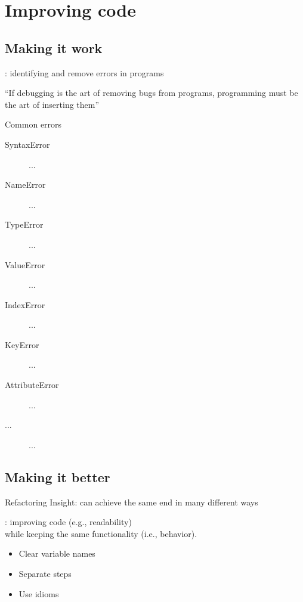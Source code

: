 \documentclass[aspectratio=169,usenames,dvipsnames]{beamer}
\begin{document}
\begin{frame}
\begin{columns}[b]
    \end{columns}
\end{frame}


\section{Improving code}
\subsection{Making it work}
\frame{\tableofcontents[currentsection]}
\begin{frame}
    \begin{definition}
        : identifying and remove errors in programs
    \end{definition}

    \pause

    ``If debugging is the art of removing bugs from programs,
    programming must be the art of inserting them''

\end{frame}

\begin{frame}{Common errors}
    \begin{description}
        \item[SyntaxError] ...
        \item[NameError] ...
        \item[TypeError] ...
        \item[ValueError] ...
        \item[IndexError] ...
        \item[KeyError] ...
        \item[AttributeError] ...
        \item[...] ...
    \end{description}
\end{frame}

\subsection{Making it better}
\frame{\tableofcontents[currentsection]}

\begin{frame}{Refactoring}
	Insight: can achieve the same end in many different ways

	\pause
	\begin{definition}
		: improving code (e.g., readability) \\
			while keeping the same functionality (i.e., behavior).
	\end{definition}

	\begin{itemize}
		\item Clear variable names
		\item Separate steps
        \item Use idioms
	\end{itemize}
\end{frame}
\end{document}
